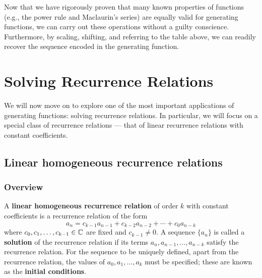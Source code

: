 \documentclass[a4paper, 12pt]{report}
\begin{document}
Now that we have rigorously proven that many known properties of functions (e.g., the power rule and Maclaurin's series) are equally valid for generating functions, we can carry out these operations without a guilty conscience. Furthermore, by scaling, shifting, and referring to the table above, we can readily recover the sequence encoded in the generating function.





{\let\clearpage\relax\chapter{Solving Recurrence Relations}\label{ch:recurrence}}
We will now move on to explore one of the most important applications of generating functions: solving recurrence relations. In particular, we will focus on a special class of recurrence relations --- that of linear recurrence relations with constant coefficients.

\clearpage

\section{Linear homogeneous recurrence relations}
\subsection{Overview}
\begin{defn}\label{def:lin-homo-recur}
A \textbf{linear homogeneous recurrence relation} of order $k$ with constant coefficients is a recurrence relation of the form \[a_n = c_{k - 1} a_{n - 1} + c_{k - 2} a_{n - 2} + \cdots + c_0 a_{n - k}\]
where $c_0, c_1, \dots, c_{k - 1} \in \mathbb{C}$ are fixed and $c_{k - 1} \neq 0$.
A sequence $\{a_n\}$ is called a \textbf{solution} of the recurrence relation if its terms $a_n, a_{n - 1}, \dots, a_{n - k}$ satisfy the recurrence relation. For the sequence to be uniquely defined, apart from the recurrence relation, the values of $a_0, a_1, \dots, a_k$ must be specified; these are known as the \textbf{initial conditions}.
\end{defn}
\end{document}
